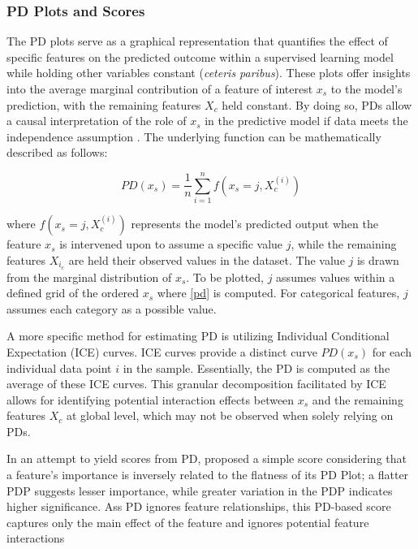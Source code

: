 \subsubsection{PD Plots and Scores}
\label{subpdp}

The PD plots serve as a graphical representation that quantifies the effect of specific features on the predicted outcome within a supervised learning model while holding other variables constant (\textit{ceteris paribus}). These plots offer insights into the average marginal contribution of a feature of interest $x_s$ to the model's prediction, with the remaining features $X_c$ held constant. By doing so, PDs allow a causal interpretation of the role of $x_s$ in the predictive model if data meets the independence assumption \cite{Zhao2021CausalModels}. The underlying function can be mathematically described as follows:

\begin{equation}
PD(x_s)=\frac{1}{n}\sum_{i=1}^{n}f(x_s=j, X^{(i)}_{c})
\label{pd}
\end{equation}

where $f(x_s = j, X^{(i)}_{c})$  represents the model's predicted output when the feature  $x_s$ is intervened upon to assume a specific value $j$, while the remaining features $X_{i_{c}}$ are held their observed values in the dataset. The value $j$ is drawn from the marginal distribution of $x_s$. To be plotted, $j$ assumes values within a defined grid of the ordered $x_s$ where \ref{pd} is computed. For categorical features, $j$ assumes each category as a possible value.

A more specific method for estimating PD is utilizing Individual Conditional Expectation (ICE) curves. ICE curves \cite{Goldstein2015PeekingExpectation} provide a distinct curve $PD(x_s)$ for each individual data point $i$ in the sample. Essentially, the PD is computed as the average of these ICE curves. This granular decomposition facilitated by ICE allows for identifying potential interaction effects between $x_s$ and the remaining features $X_c$ at global level, which may not be observed when solely relying on PDs. 

In an attempt to yield scores from PD, \cite{Greenwell2018AMeasure} proposed a simple score considering that a feature's importance is inversely related to the flatness of its PD Plot; a flatter PDP suggests lesser importance, while greater variation in the PDP indicates higher significance. Ass PD ignores feature relationships, this PD-based score captures only the main effect of the feature and ignores potential feature interactions

